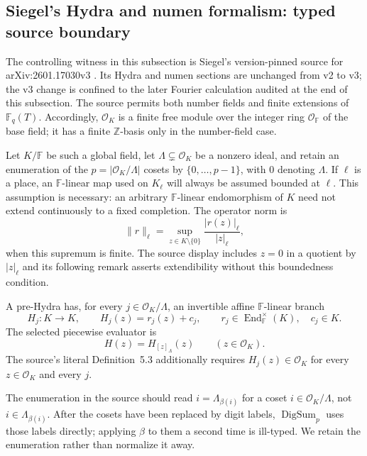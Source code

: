 \subsection{Siegel's Hydra and numen formalism: typed source boundary}
\label{sec:Siegel-Hydra-numen}

The controlling witness in this subsection is Siegel's version-pinned source
for arXiv:2601.17030v3 \cite{Siegel2026v3}.  Its Hydra and numen sections are
unchanged from v2 to v3; the v3 change is confined to the later Fourier
calculation audited at the end of this subsection.  The source permits both
number fields and finite extensions of $\mathbb F_q(T)$.  Accordingly,
$\mathcal O_K$ is a finite free module over the integer ring
$\mathcal O_{\mathbb F}$ of the base field; it has a finite
$\mathbb Z$-basis only in the number-field case.

Let $K/\mathbb F$ be such a global field, let
$\Lambda\subsetneq\mathcal O_K$ be a nonzero ideal, and retain an enumeration
of the $p=\lvert\mathcal O_K/\Lambda\rvert$ cosets by
$\{0,\ldots,p-1\}$, with $0$ denoting $\Lambda$.  If $\ell$ is a place, an
$\mathbb F$-linear map used on $K_\ell$ will always be assumed bounded at
$\ell$.  This assumption is necessary: an arbitrary
$\mathbb F$-linear endomorphism of $K$ need not extend continuously to a fixed
completion.  The operator norm is
\[
 \lVert r\rVert_\ell
 =\sup_{z\in K\setminus\{0\}}\frac{|r(z)|_\ell}{|z|_\ell},
\]
when this supremum is finite.  The source display includes $z=0$ in a quotient
by $|z|_\ell$ and its following remark asserts extendibility without this
boundedness condition.

\begin{definition}
\label{def:Siegel-Hydra-v3}
A pre-Hydra has, for every $j\in\mathcal O_K/\Lambda$, an invertible affine
$\mathbb F$-linear branch
\[
 H_j:K\longrightarrow K,\qquad H_j(z)=r_j(z)+c_j,
 \qquad
 r_j\in\operatorname{End}_{\mathbb F}^{\times}(K),\quad c_j\in K.
\]
The selected piecewise evaluator is
\[
 H(z)=H_{[z]_\Lambda}(z)\qquad(z\in\mathcal O_K).
\]
The source's literal Definition~5.3 additionally requires
$H_j(z)\in\mathcal O_K$ for every $z\in\mathcal O_K$ and every $j$.
\end{definition}

The enumeration in the source should read
$i=\Lambda_{\beta(i)}$ for a coset $i\in\mathcal O_K/\Lambda$, not
$i\in\Lambda_{\beta(i)}$.  After the cosets have been replaced by digit
labels, $\operatorname{DigSum}_p$ uses those labels directly; applying
$\beta$ to them a second time is ill-typed.  We retain the enumeration rather
than normalize it away.

